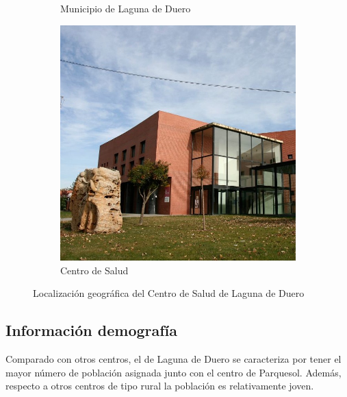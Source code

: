 \begin{figure}[H]
\begin{subfigure}[H]{0.48\textwidth}
        \caption{Municipio de Laguna de Duero}
    \end{subfigure}
    \hfill
    \begin{subfigure}[H]{0.48\textwidth}
        \centering
        \includegraphics*[width=\textwidth]{img/centro-salud.jpg}
        \caption{Centro de Salud}
    \end{subfigure}
    \caption{Localización geográfica del Centro de Salud de Laguna de Duero}
    \label{fig:localizacion-centro}
\end{figure}

\subsection{Información demografía}

Comparado con otros centros, el de Laguna de Duero se caracteriza por tener el mayor número de población asignada junto con el centro de Parquesol. Además, respecto a otros centros de tipo rural la población es relativamente joven.

